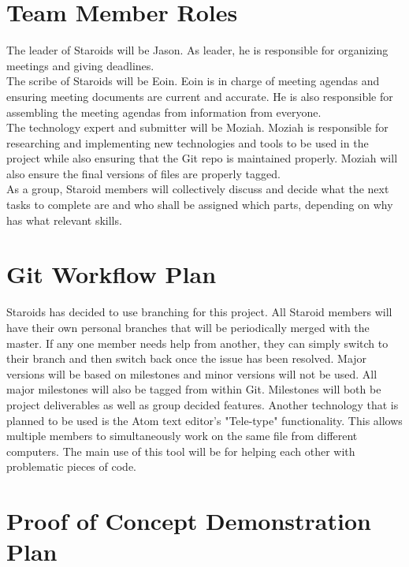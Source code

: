 \documentclass{article}
\begin{document}
\section{Team Member Roles}
The leader of Staroids will be Jason. As leader, he is responsible for organizing meetings and giving deadlines.\\
The scribe of Staroids will be Eoin. Eoin is in charge of meeting agendas and ensuring meeting documents are current and accurate. He is also responsible for assembling the meeting agendas from information from everyone.\\
The technology expert and submitter will be Moziah. Moziah is responsible for researching and implementing new technologies and tools to be used in the project while also ensuring that the Git repo is maintained properly. Moziah will also ensure the final versions of files are properly tagged.\\
As a group, Staroid members will collectively discuss and decide what the next tasks to complete are and who shall be assigned which parts, depending on why has what relevant skills.

\section{Git Workflow Plan}
Staroids has decided to use branching for this project. All Staroid members will have their own personal branches that will be periodically merged with the master. If any one member needs help from another, they can simply switch to their branch and then switch back once the issue has been resolved. Major versions will be based on milestones and minor versions will not be used. All major milestones will also be tagged from within Git. Milestones will both be project deliverables as well as group decided features. Another technology that is planned to be used is the Atom text editor's "Tele-type" functionality. This allows multiple members to simultaneously work on the same file from different computers. The main use of this tool will be for helping each other with problematic pieces of code.\\

\section{Proof of Concept Demonstration Plan}

\end{document}
